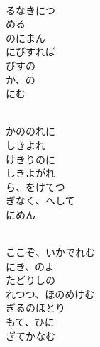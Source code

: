 \documentclass[10pt,b5j]{tarticle} %
\begin{document}
\begin{enumerate}
\begin{minipage}[c]{\blocksize}
        \vspace{\linespace}
        \item~\\
        るなきにつ\\
        める\\
        のにまん\\
        にびすれば\\
        びすの\\
        か、の\\
        にむ
        
    \end{minipage}
    \begin{minipage}[c]{\blocksize}
        
        \vspace{\linespace}
        \item~\\
        かののれに\\
        しきよれ\\
        けきりのに\\
        しきよがれ\\
        ら、をけてつ\\
        ぎなく、へして\\
        にめん
        
    \end{minipage}
    \begin{minipage}[c]{\blocksize}
        
        \vspace{\linespace}
        \item~\\
        ここぞ、いかでれむ\\
        にき、のよ\\
        たどりしの\\
        れつつ、ほのめけむ\\
        ぎるのほとり\\
        もて、ひに\\
        ぎてかなむ
    
    \end{minipage}
\end{enumerate} %
\end{document}
